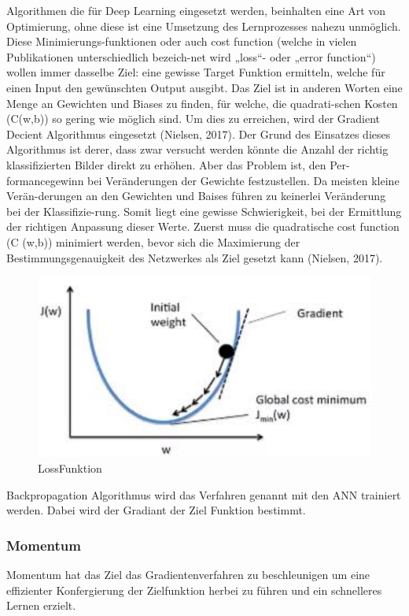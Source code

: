\documentclass{llncs}
\begin{document}
Algorithmen die für Deep Learning eingesetzt werden, beinhalten eine Art von Optimierung, ohne diese ist eine Umsetzung des Lernprozesses nahezu unmöglich. Diese Minimierungs-funktionen oder auch cost function (welche in vielen Publikationen unterschiedlich bezeich-net wird „loss“- oder „error function“) wollen immer dasselbe Ziel: eine gewisse Target Funktion ermitteln, welche für einen Input den gewünschten Output ausgibt. Das Ziel ist in anderen Worten eine Menge an Gewichten und Biases zu finden, für welche, die quadrati-schen Kosten (C(w,b)) so gering wie möglich sind. Um dies zu erreichen, wird der Gradient Decient Algorithmus eingesetzt (Nielsen, 2017).
Der Grund des Einsatzes dieses Algorithmus ist derer, dass zwar versucht werden könnte die Anzahl der richtig klassifizierten Bilder direkt zu erhöhen. Aber das Problem ist, den Per-formancegewinn bei Veränderungen der Gewichte festzustellen. Da meisten kleine Verän-derungen an den Gewichten und Baises führen zu keinerlei Veränderung bei der Klassifizie-rung. Somit liegt eine gewisse Schwierigkeit, bei der Ermittlung der richtigen Anpassung dieser Werte. Zuerst muss die quadratische cost function (C (w,b)) minimiert werden, bevor sich die Maximierung der Bestimmungsgenauigkeit des Netzwerkes als Ziel gesetzt kann (Nielsen, 2017).
\begin{figure}[htbp] 
	\centering
	\includegraphics[width=1.0\textwidth]{gradient.png}
	\caption{LossFunktion}
	\label{fig:Bild6}
\end{figure}

Backpropagation Algorithmus wird das Verfahren genannt mit den ANN trainiert werden. Dabei wird der Gradiant der Ziel Funktion bestimmt.

\subsubsection{Momentum}
Momentum hat das Ziel das Gradientenverfahren zu beschleunigen  um eine effizienter Konfergierung der Zielfunktion herbei zu führen und ein schnelleres Lernen erzielt. 
\end{document}
